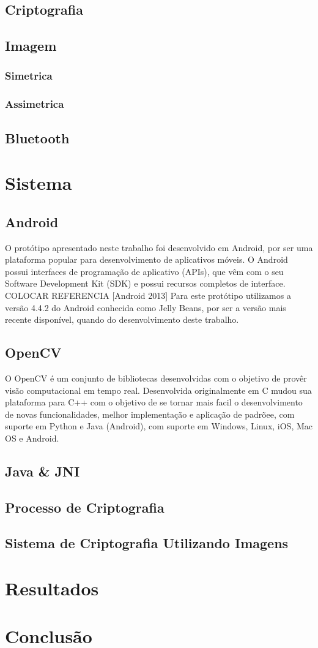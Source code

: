\documentclass[12pt]{article}
\begin{document}
\subsection{Criptografia}
\subsection{Imagem}
\subsubsection{Simetrica}
\subsubsection{Assimetrica}
\subsection{Bluetooth}

\section{Sistema}
\subsection{Android}
O protótipo apresentado neste trabalho foi desenvolvido em Android, por ser uma plataforma popular para desenvolvimento de aplicativos móveis. O Android possui interfaces de programação de aplicativo (APIs), que vêm com o seu Software Development Kit (SDK) e possui recursos completos de interface. COLOCAR REFERENCIA [Android 2013]
Para este protótipo utilizamos a versão 4.4.2 do Android conhecida como Jelly Beans, por ser a versão mais recente disponível, quando do desenvolvimento deste trabalho. 

\subsection{OpenCV}
O OpenCV é um conjunto de bibliotecas desenvolvidas com o objetivo de provêr visão computacional em tempo real. Desenvolvida originalmente em C mudou sua plataforma para C++ com o objetivo de se tornar mais facil o desenvolvimento de novas funcionalidades, melhor implementação e aplicação de padrõee, com suporte em Python e Java (Android), com suporte em Windows, Linux, iOS, Mac OS e Android.
\subsection{Java \& JNI}
\subsection{Processo de Criptografia}
\subsection{Sistema de Criptografia Utilizando Imagens}

\section{Resultados}
\section{Conclusão}




\end{document}
